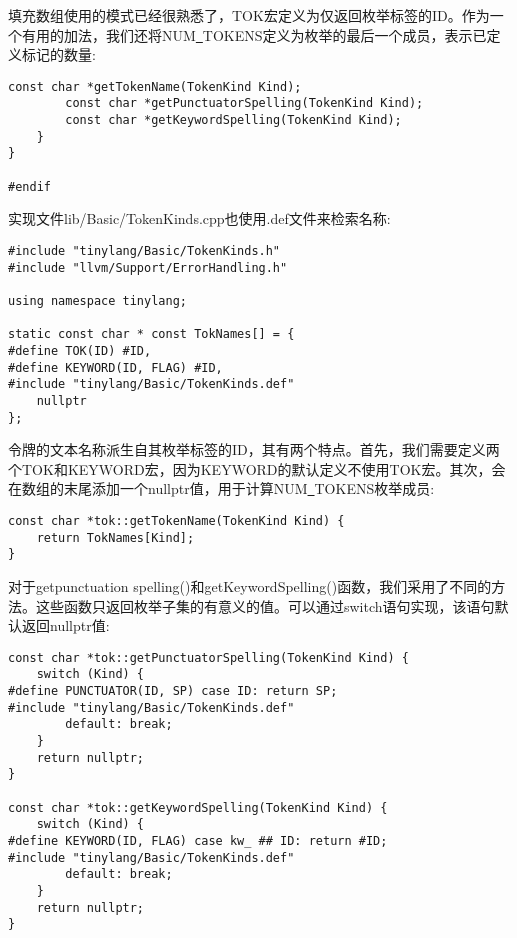 填充数组使用的模式已经很熟悉了，TOK宏定义为仅返回枚举标签的ID。作为一个有用的加法，我们还将NUM\underline{~}TOKENS定义为枚举的最后一个成员，表示已定义标记的数量:\par

\begin{lstlisting}[caption={}]
		const char *getTokenName(TokenKind Kind);
		const char *getPunctuatorSpelling(TokenKind Kind);
		const char *getKeywordSpelling(TokenKind Kind);
	}
}

#endif
\end{lstlisting}

实现文件lib/Basic/TokenKinds.cpp也使用.def文件来检索名称:\par

\begin{lstlisting}[caption={}]
#include "tinylang/Basic/TokenKinds.h"
#include "llvm/Support/ErrorHandling.h"

using namespace tinylang;

static const char * const TokNames[] = {
#define TOK(ID) #ID,
#define KEYWORD(ID, FLAG) #ID,
#include "tinylang/Basic/TokenKinds.def"
	nullptr
};
\end{lstlisting}

令牌的文本名称派生自其枚举标签的ID，其有两个特点。首先，我们需要定义两个TOK和KEYWORD宏，因为KEYWORD的默认定义不使用TOK宏。其次，会在数组的末尾添加一个nullptr值，用于计算NUM\underline{~}TOKENS枚举成员:\par

\begin{lstlisting}[caption={}]
const char *tok::getTokenName(TokenKind Kind) {
	return TokNames[Kind];
}
\end{lstlisting}

对于getpunctuation spelling()和getKeywordSpelling()函数，我们采用了不同的方法。这些函数只返回枚举子集的有意义的值。可以通过switch语句实现，该语句默认返回nullptr值:\par

\begin{lstlisting}[caption={}]
const char *tok::getPunctuatorSpelling(TokenKind Kind) {
	switch (Kind) {
#define PUNCTUATOR(ID, SP) case ID: return SP;
#include "tinylang/Basic/TokenKinds.def"
		default: break;
	}
	return nullptr;
}

const char *tok::getKeywordSpelling(TokenKind Kind) {
	switch (Kind) {
#define KEYWORD(ID, FLAG) case kw_ ## ID: return #ID;
#include "tinylang/Basic/TokenKinds.def"
		default: break;
	}
	return nullptr;
}
\end{lstlisting}

